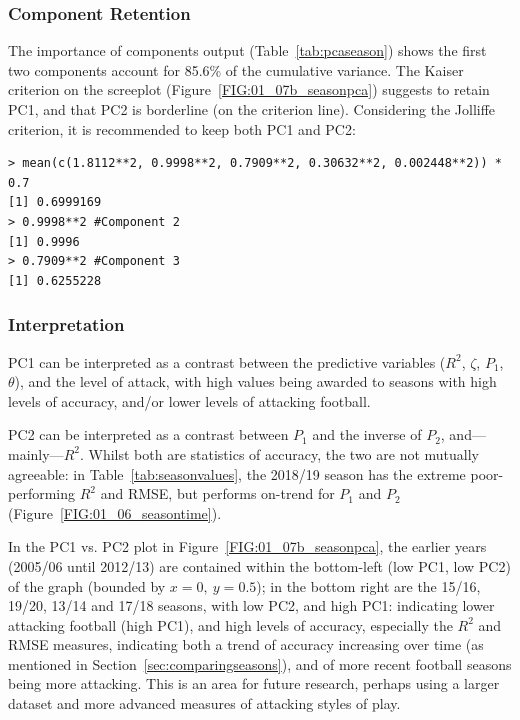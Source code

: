 \documentclass[a4paper,10pt]{report}
\begin{document}
\pagebreak

\subsubsection{Component Retention}
The importance of components output (Table~\ref{tab:pcaseason}) shows the first two components account for 85.6\% of the cumulative variance. The Kaiser criterion on the screeplot (Figure~\ref{FIG:01_07b_seasonpca}) suggests to retain PC1, and that PC2 is borderline (on the criterion line). Considering the Jolliffe criterion, it is recommended to keep both PC1 and PC2:

\begin{lstlisting}
> mean(c(1.8112**2, 0.9998**2, 0.7909**2, 0.30632**2, 0.002448**2)) * 0.7
[1] 0.6999169
> 0.9998**2 #Component 2
[1] 0.9996
> 0.7909**2 #Component 3
[1] 0.6255228
\end{lstlisting}

\subsubsection{Interpretation}
PC1 can be interpreted as a contrast between the predictive variables ($R^2$, $\zeta$, $P_1$, $\theta$), and the level of attack, with high values being awarded to seasons with high levels of accuracy, and/or lower levels of attacking football.

PC2 can be interpreted as a contrast between $P_1$ and the inverse of $P_2$, and---mainly---$R^2$. Whilst both are statistics of accuracy, the two are not mutually agreeable: in Table~\ref{tab:seasonvalues}, the 2018/19 season has the extreme poor-performing $R^2$ and RMSE, but performs on-trend for $P_1$ and $P_2$ (Figure~\ref{FIG:01_06_seasontime}). \vspace{3mm}

In the PC1 vs. PC2 plot in Figure~\ref{FIG:01_07b_seasonpca}, the earlier years (2005/06 until 2012/13) are contained within the bottom-left (low PC1, low PC2) of the graph (bounded by $x=0,\ y=0.5$); in the bottom right are the 15/16, 19/20, 13/14 and 17/18 seasons, with low PC2, and high PC1: indicating lower attacking football (high PC1), and high levels of accuracy, especially the $R^2$ and RMSE measures, indicating both a trend of accuracy increasing over time (as mentioned in Section~\ref{sec:comparingseasons}), and of more recent football seasons being more attacking. This is an area for future research, perhaps using a larger dataset and more advanced measures of attacking styles of play.
\end{document}
